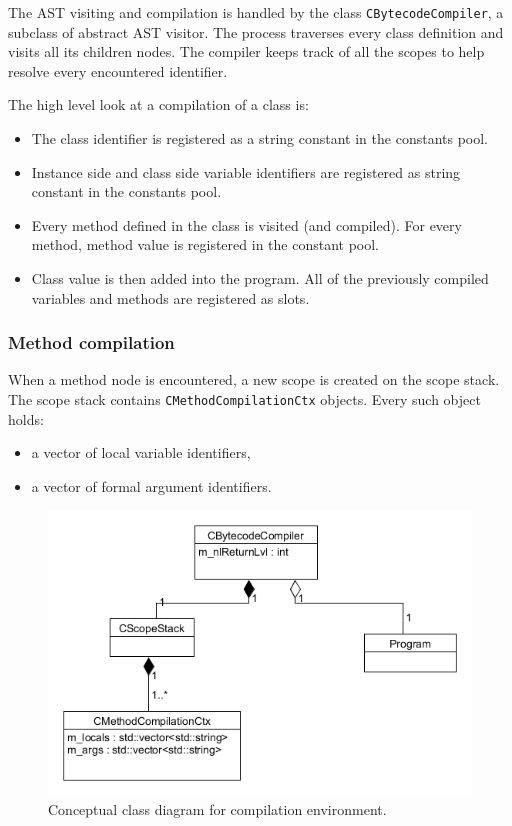 \documentclass[thesis=M,english]{FITthesis}[2019/12/23]
\begin{document}
The AST visiting and compilation is handled by the class \texttt{CBytecodeCompiler}, a subclass of abstract AST visitor. The process traverses every class definition
and visits all its children nodes. The compiler keeps track of all the scopes to help resolve every encountered identifier. 

The high level look at a compilation of a class is:
\begin{itemize}
	\item The class identifier is registered as a string constant in the constants pool.
	\item Instance side and class side variable identifiers are registered as string constant in the constants pool.
	\item Every method defined in the class is visited (and compiled). For every method, method value is registered in the constant pool.
	\item Class value is then added into the program. All of the previously compiled variables and methods are registered as slots.
\end{itemize}

\subsubsection{Method compilation}
When a method node is encountered, a new scope is created on the scope stack. The scope stack contains \texttt{CMethodCompilationCtx} objects. Every such object holds:
\begin{itemize}
	\item a vector of local variable identifiers,
	\item a vector of formal argument identifiers.
\end{itemize}

\begin{figure}[h!]
	\centering
	\includegraphics[width=\textwidth]{media/classDiagram_compilation.png}
	\caption{Conceptual class diagram for compilation environment.}
	\label{fig:class_compilation}
\end{figure}
\end{document}
